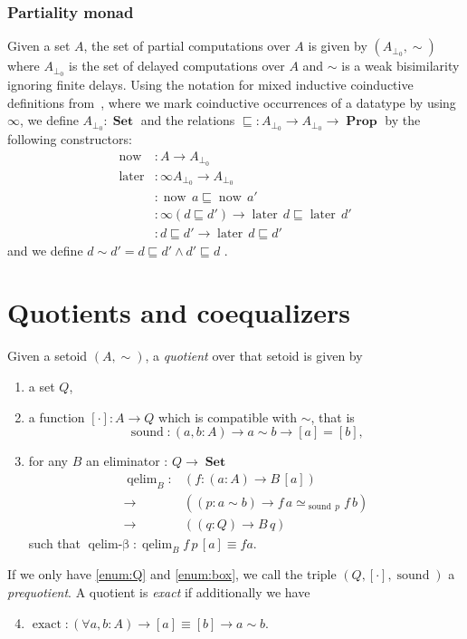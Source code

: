 \documentclass[envcountsame]{llncs}
\providecommand{\class}[1]{[#1]}
\DeclareMathOperator{\Prop}{\mathbf{Prop}}
\DeclareMathOperator{\Set}{\mathbf{Set}}
\DeclareMathOperator{\sound}{sound}
\DeclareMathOperator{\qelimbeta}{qelim-\beta}
\DeclareMathOperator{\exact}{exact}
\DeclareMathOperator{\now}{now}
\DeclareMathOperator{\later}{later}
\DeclareMathOperator{\nowequal}{now_\sqsubseteq}
\DeclareMathOperator{\laterequal}{later_\sqsubseteq}
\DeclareMathOperator{\laterleft}{later_{left}}
\DeclareMathOperator{\qelim}{qelim}
\begin{document}
\subsubsection*{Partiality monad}
Given a set $A$, the set of partial computations over $A$ is given by $(A_{\bot_0},{\sim})$ where $A_{\bot_0}$ is the set of delayed computations over $A$  and $\sim$ is a weak bisimilarity ignoring finite delays. Using the notation for mixed inductive coinductive  definitions from~\cite{danielson:altenkirch:2010}, where we mark coinductive occurrences of a datatype by using $\infty$, we define $A_{\bot_0} : \Set$ and the relations $\sqsubseteq:A_{\bot_0}\to A_{\bot_0} \to \Prop$ by the following constructors:
\begin{align*}
\now  &: A \to A_{\bot_0}\\
\later &: \infty A_{\bot_0} \to  A_{\bot_0}\\
\nowequal &: \now\, a \sqsubseteq \now\,a'\\
\laterequal &: \infty(d \sqsubseteq d') \to \later\,d \sqsubseteq \later\,d'\\
\laterleft &: d\sqsubseteq d' \to \later\,d \sqsubseteq d'
\end{align*}
and we define $d\sim d'= d\sqsubseteq d' \wedge d'\sqsubseteq d$ .

\section{Quotients and coequalizers}\label{sec:quotients}
 
\begin{definition}
\label{def:quotient}
Given a setoid $(A,\sim)$,  a \emph{quotient} over that setoid is given by

\begin{enumerate}
\item \label{enum:Q} a set $Q$,
\item \label{enum:box}a function $\class\cdot\colon A \to Q$ which is compatible with $\sim$, 
that is \[\sound\colon (a,b : A) \to a\sim b \to [a] = [b],\]
\item \label{enum:elim}   for any $B$ an eliminator : $Q\to\Set$
 \begin{align*}
 \qelim_B\colon &(f\colon (a:A) \to B\,\class a) \\
        {\to}\, &((p:a\sim b) \to f\,a \simeq_{\sound\,p}f\,b)\\
        {\to}\, &((q:Q) \to B\,q)
 \end{align*}
such that $\qelimbeta\colon \qelim_B f \,p\,\class a\equiv f a$.
 
\end{enumerate}
If we only have \ref{enum:Q} and \ref{enum:box}, we call the triple $(Q,\class\cdot, \sound)$ a \emph{prequotient}.
A quotient is \emph{exact} if additionally
we have 
\begin{enumerate}
\setcounter{enumi}{3}
\item $\exact :(\forall a,b : A) \to  \class a \equiv \class b \to a \sim b$.

\end{enumerate}
\end{definition}
\end{document}
